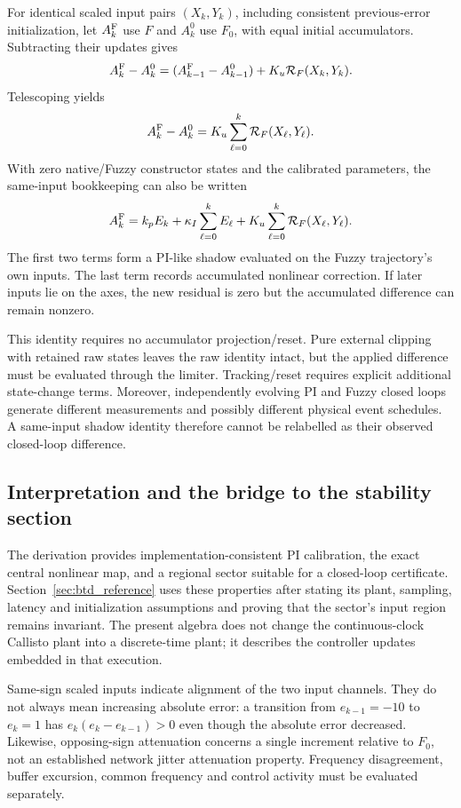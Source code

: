 For identical scaled input pairs $(X_k,Y_k)$, including consistent
previous-error initialization, let $A_k^{\rm F}$ use $F$ and
$A_k^0$ use $F_0$, with equal initial accumulators. Subtracting their
updates gives
\[
 A_k^{\rm F}-A_k^0=(A_{k-1}^{\rm F}-A_{k-1}^0)
                  +K_u\mathcal R_F(X_k,Y_k).
\]
Telescoping yields
\begin{equation}
 A_k^{\rm F}-A_k^0=K_u\sum_{\ell=0}^{k}\mathcal R_F(X_\ell,Y_\ell).
 \label{eq:fpi_memory}
\end{equation}
With zero native/Fuzzy constructor states and the calibrated parameters,
the same-input bookkeeping can also be written
\begin{equation}
 A_k^{\rm F}=k_pE_k+\kappa_I\sum_{\ell=0}^{k}E_\ell
             +K_u\sum_{\ell=0}^{k}\mathcal R_F(X_\ell,Y_\ell).
 \label{eq:fpd_accounting}
\end{equation}
The first two terms form a PI-like shadow evaluated on the Fuzzy
trajectory's own inputs. The last term records accumulated nonlinear
correction. If later inputs lie on the axes, the new residual is zero
but the accumulated difference can remain nonzero.

This identity requires no accumulator projection/reset. Pure external
clipping with retained raw states leaves the raw identity intact, but the
applied difference must be evaluated through the limiter. Tracking/reset
requires explicit additional state-change terms. Moreover, independently
evolving PI and Fuzzy closed loops generate different measurements and
possibly different physical event schedules. A same-input shadow identity
therefore cannot be relabelled as their observed closed-loop difference.

\subsection{Interpretation and the bridge to the stability section}

The derivation provides implementation-consistent PI calibration,
the exact central nonlinear map, and a regional sector suitable for a
closed-loop certificate. Section~\ref{sec:btd_reference} uses these properties after stating its
plant, sampling, latency and initialization assumptions and proving that
the sector's input region remains invariant. The present algebra does not
change the continuous-clock Callisto plant into a discrete-time plant;
it describes the controller updates embedded in that execution.

Same-sign scaled inputs indicate alignment of the two input channels.
They do not always mean increasing absolute error: a transition from
$e_{k-1}=-10$ to $e_k=1$ has $e_k(e_k-e_{k-1})>0$ even though the
absolute error decreased. Likewise, opposing-sign attenuation concerns a
single increment relative to $F_0$, not an established network jitter
attenuation property. Frequency disagreement, buffer excursion, common
frequency and control activity must be evaluated separately.

